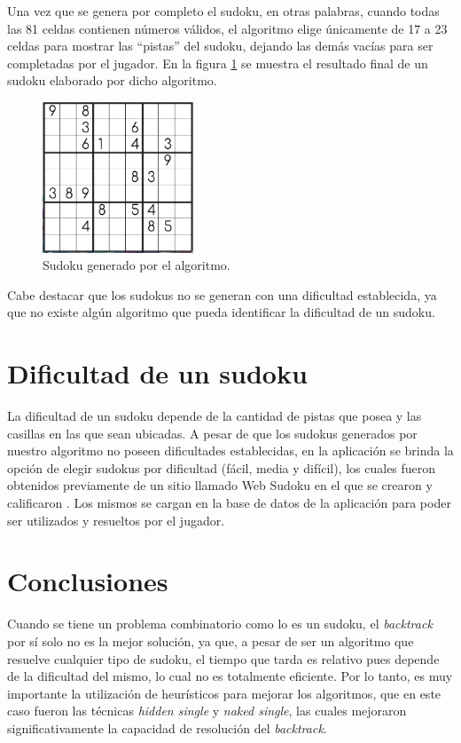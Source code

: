 \documentclass[conference]{IEEEtran}
\begin{document}
Una vez que se genera por completo el sudoku, en otras palabras, cuando todas las 81 celdas contienen números válidos, el algoritmo elige únicamente de 17 a 23 celdas para mostrar las “pistas” del sudoku, dejando las demás vacías para ser completadas por el jugador. En la figura \ref{fig:generate} se muestra el resultado final de un sudoku elaborado por dicho algoritmo.

\begin{otherlanguage}{spanish}
\begin{figure}[H]
\centering
\includegraphics[width=0.4\textwidth]{generate.png}
\caption{\label{fig:generate}Sudoku generado por el algoritmo.}
\end{figure}
\end{otherlanguage}

Cabe destacar que los sudokus no se generan con una dificultad establecida, ya que no existe algún algoritmo que pueda identificar la dificultad de un sudoku.

\section{Dificultad de un sudoku}

La dificultad de un sudoku depende de la cantidad de pistas que posea y las casillas en las que sean ubicadas. A pesar de que los sudokus generados por nuestro algoritmo no poseen dificultades establecidas, en la aplicación se brinda la opción de elegir sudokus por dificultad (fácil, media y difícil), los cuales fueron obtenidos previamente de un sitio llamado Web Sudoku en el que se crearon y calificaron  \cite{websudoku}. Los mismos se cargan en la base de datos de la aplicación para poder ser utilizados y resueltos por el jugador.

\section{Conclusiones}
Cuando se tiene un problema combinatorio como lo es un sudoku, el \textit{backtrack} por sí solo no es la mejor solución, ya que, a pesar de ser un algoritmo que resuelve cualquier tipo de sudoku, el tiempo que tarda es relativo pues depende de la dificultad del mismo, lo cual no es totalmente eficiente. Por lo tanto, es muy importante la utilización de heurísticos para mejorar los algoritmos, que en este caso fueron las técnicas \textit{hidden single} y \textit{naked single}, las cuales mejoraron significativamente la capacidad de resolución del \textit{backtrack}.
\end{document}
